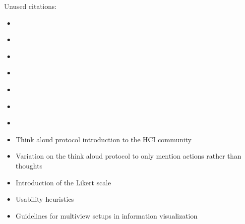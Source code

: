 Unused citations:
\begin{itemize}
\item \cite{tory2005evaluating}
\item \cite{munzner2009nested}
\item \cite{tory2004human}
\item \cite{kirby2013visualization}
\item \cite{van2006bridging}
\item \cite{kosara2003thoughts}
\item \cite{carpendale2008evaluating}

\item \cite{lewis1993task} Think aloud protocol introduction to the HCI community
\item \cite{ericsson1980verbal} Variation on the think aloud protocol to only mention actions rather than thoughts
\item \cite{likert1932technique} Introduction of the Likert scale
\item \cite{nielsen1994heuristic} Usability heuristics
\item \cite{wang2000guidelines} Guidelines for multiview setups in information visualization
\end{itemize}